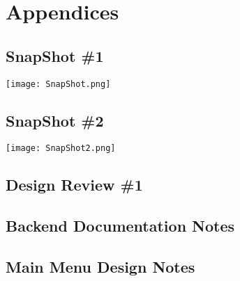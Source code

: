 \documentclass{scrreprt}
\begin{document}
\chapter{Appendices}
\pagebreak
    
\section{SnapShot \#1}

\texttt{[image: SnapShot.png]}\\
\pagebreak

\section {SnapShot \#2}
\texttt{[image: SnapShot2.png]}\\
\pagebreak

\section{Design Review \#1}
\pagebreak
\section{Backend Documentation Notes}
\pagebreak
\section{Main Menu Design Notes}
\pagebreak
\end{document}
